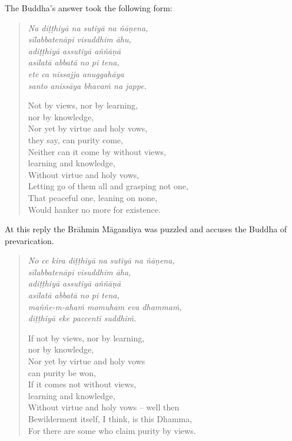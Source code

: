 \clearpage

The Buddha's answer took the following form:

\begin{quote}
\emph{Na diṭṭhiyā na sutiyā na ñāṇena,}\\
\emph{sīlabbatenāpi visuddhim āhu,}\\
\emph{adiṭṭhiyā assutiyā aññāṇā}\\
\emph{asīlatā abbatā no pi tena,}\\
\emph{ete ca nissajja anuggahāya}\\
\emph{santo anissāya bhavaṁ na jappe.}

Not by views, nor by learning,\\
\vin nor by knowledge,\\
Nor yet by virtue and holy vows,\\
\vin they say, can purity come,\\
Neither can it come by without views,\\
\vin learning and knowledge,\\
Without virtue and holy vows,\\
Letting go of them all and grasping not one,\\
That peaceful one, leaning on none,\\
Would hanker no more for existence.
\end{quote}

At this reply the Brāhmin Māgandiya was puzzled and accuses the Buddha of prevarication.

\begin{quote}
\emph{No ce kira diṭṭhiyā na sutiyā na ñāṇena,}\\
\emph{sīlabbatenāpi visuddhim āha,}\\
\emph{adiṭṭhiyā assutiyā aññāṇā}\\
\emph{asīlatā abbatā no pi tena,}\\
\emph{maññe-m-ahaṁ momuham eva dhammaṁ,}\\
\emph{diṭṭhiyā eke paccenti suddhiṁ.}

If not by views, nor by learning,\\
\vin nor by knowledge,\\
Nor yet by virtue and holy vows\\
\vin can purity be won,\\
If it comes not without views,\\
\vin learning and knowledge,\\
Without virtue and holy vows -- well then\\
Bewilderment itself, I think, is this Dhamma,\\
For there are some who claim purity by views.
\end{quote}

